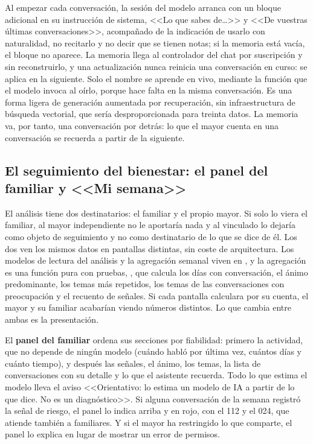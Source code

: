 Al empezar cada conversación, la sesión del modelo arranca con un bloque adicional en su instrucción de sistema, <<Lo que sabes de\ldots>> y <<De vuestras últimas conversaciones>>, acompañado de la indicación de usarlo con naturalidad, no recitarlo y no decir que se tienen notas; si la memoria está vacía, el bloque no aparece. La memoria llega al controlador del chat por suscripción y sin reconstruirlo, y una actualización nunca reinicia una conversación en curso: se aplica en la siguiente. Solo el nombre se aprende en vivo, mediante la función que el modelo invoca al oírlo, porque hace falta en la misma conversación. Es una forma ligera de generación aumentada por recuperación, sin infraestructura de búsqueda vectorial, que sería desproporcionada para treinta datos. La memoria va, por tanto, una conversación por detrás: lo que el mayor cuenta en una conversación se recuerda a partir de la siguiente.

\subsection{El seguimiento del bienestar: el panel del familiar y <<Mi semana>>}
\label{sec:bienestar}

El análisis tiene dos destinatarios: el familiar y el propio mayor. Si solo lo viera el familiar, al mayor independiente no le aportaría nada y al vinculado lo dejaría como objeto de seguimiento y no como destinatario de lo que se dice de él. Los dos ven los mismos datos en pantallas distintas, sin coste de arquitectura. Los modelos de lectura del análisis y la agregación semanal viven en , y la agregación es una función pura con pruebas, , que calcula los días con conversación, el ánimo predominante, los temas más repetidos, los temas de las conversaciones con preocupación y el recuento de señales. Si cada pantalla calculara por su cuenta, el mayor y su familiar acabarían viendo números distintos. Lo que cambia entre ambas es la presentación.

El \textbf{panel del familiar} ordena sus secciones por fiabilidad: primero la actividad, que no depende de ningún modelo (cuándo habló por última vez, cuántos días y cuánto tiempo), y después las señales, el ánimo, los temas, la lista de conversaciones con su detalle y lo que el asistente recuerda. Todo lo que estima el modelo lleva el aviso <<Orientativo: lo estima un modelo de IA a partir de lo que dice. No es un diagnóstico>>. Si alguna conversación de la semana registró la señal de riesgo, el panel lo indica arriba y en rojo, con el 112 y el 024, que atiende también a familiares. Y si el mayor ha restringido lo que comparte, el panel lo explica en lugar de mostrar un error de permisos.

